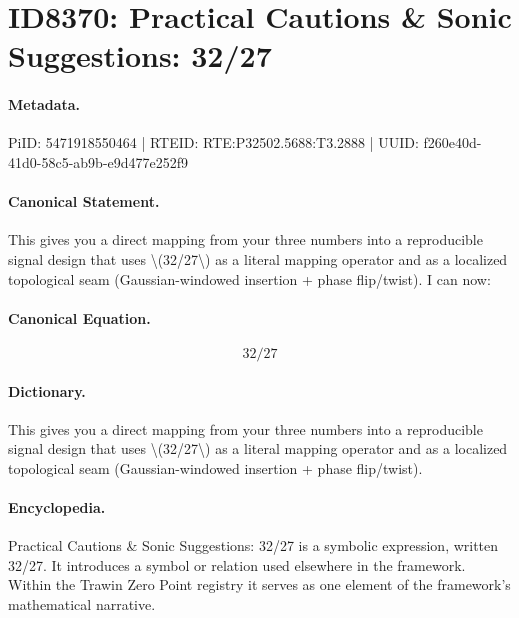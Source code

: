 \section*{ID8370: Practical Cautions \& Sonic Suggestions: 32/27}
\paragraph{Metadata.}
PiID: 5471918550464 | RTEID: RTE:P32502.5688:T3.2888 | UUID: f260e40d-41d0-58c5-ab9b-e9d477e252f9

\paragraph{Canonical Statement.}
This gives you a direct mapping from your three numbers into a reproducible signal design that uses \textbackslash{}(32/27\textbackslash{}) as a literal mapping operator and as a localized topological seam (Gaussian-windowed insertion + phase flip/twist). I can now:

\paragraph{Canonical Equation.}
\[
32/27
\]

\paragraph{Dictionary.}
This gives you a direct mapping from your three numbers into a reproducible signal design that uses \textbackslash{}(32/27\textbackslash{}) as a literal mapping operator and as a localized topological seam (Gaussian-windowed insertion + phase flip/twist).

\paragraph{Encyclopedia.}
Practical Cautions \& Sonic Suggestions: 32/27 is a symbolic expression, written 32/27. It introduces a symbol or relation used elsewhere in the framework. Within the Trawin Zero Point registry it serves as one element of the framework's mathematical narrative.
